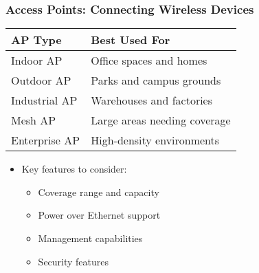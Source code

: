 \documentclass{beamer}
\begin{document}
\begin{frame}
    \frametitle{Access Points: Connecting Wireless Devices}
    
    \begin{tabular}{|p{}|p{}|}
        \hline
        \textbf{AP Type} & \textbf{Best Used For} \\
        \hline
        Indoor AP & Office spaces and homes \\
        \hline
        Outdoor AP & Parks and campus grounds \\
        \hline
        Industrial AP & Warehouses and factories \\
        \hline
        Mesh AP & Large areas needing coverage \\
        \hline
        Enterprise AP & High-density environments \\
        \hline
    \end{tabular}
    
    \begin{itemize}
        \item Key features to consider:
        \begin{itemize}
            \item Coverage range and capacity
            \item Power over Ethernet support
            \item Management capabilities
            \item Security features
        \end{itemize}
    \end{itemize}
\end{frame}
\end{document}
